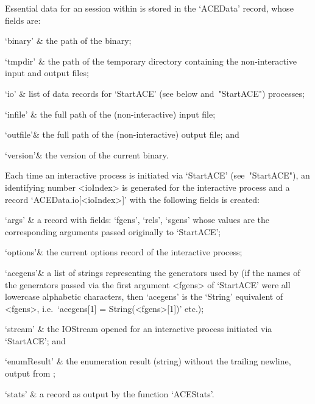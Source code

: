 
Essential data for an {\ACE} session within {\GAP} is  stored  in  the
`ACEData'{\undoquotes{}}   record,
whose fields are:

\beginitems

\quad`binary' & the path of the {\ACE} binary;

\quad`tmpdir' & the path of the  temporary  directory  containing  the
non-interactive {\ACE} input and output files;

\quad`io'     & list  of  data  records  for  `StartACE'   (see  below 
and~"StartACE") processes;

\quad`infile' & the full path of the  (non-interactive)  {\ACE}  input
file;

\quad`outfile'& the full path of the (non-interactive)  {\ACE}  output
file; and

\quad`version'& the version of the current {\ACE} binary.

\enditems

Each time an interactive {\ACE} process is  initiated  via  `StartACE'
(see~"StartACE"), an identifying number <ioIndex> is generated for the
interactive process and  a  record  `ACEData.io[<ioIndex>]'  with  the
following fields is created:

\beginitems

\quad`args'   & a record with fields: `fgens', `rels',  `sgens'  whose
values  are  the  corresponding   arguments   passed   originally   to
`StartACE';

\quad`options'& the current options record of the interactive process;

\quad`acegens'& a list of strings representing the generators used  by
{\ACE} (if the names of the generators passed via the  first  argument
<fgens> of `StartACE' were all lowercase alphabetic  characters,  then
`acegens' is the `String' equivalent of <fgens>,  i.e.~`acegens[1]   =
String(<fgens>[1])' etc.);

\quad`stream' & the IOStream opened for an interactive {\ACE}  process
initiated via `StartACE'; and

\quad`enumResult' 
              & the enumeration result (string) without  the  trailing
newline, output from {\ACE};

\quad`stats'  & a record as output by the function `ACEStats'.

\enditems

